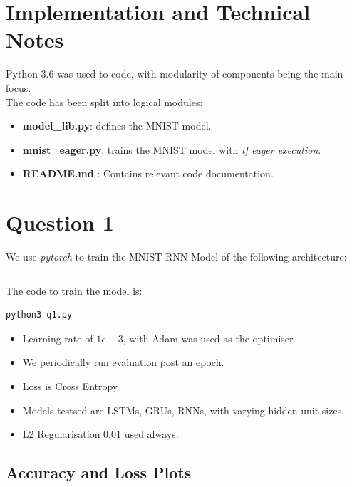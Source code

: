\section {Implementation and Technical Notes}

Python 3.6 was used to code, with modularity of components being the main focus. \\

The code has been split into logical modules: \\
\begin{itemize}
\item \textbf{model\_lib.py}: defines the MNIST model. 
\item \textbf{mnist\_eager.py}: trains the MNIST model with \textit{tf eager execution}. 
\item  \textbf{README.md }: Contains relevant code documentation.
\end{itemize}


\section {Question 1}

We use \textit{pytorch } to train the MNIST RNN Model of the following architecture:

\begin{lstlisting}

\end{lstlisting}

The code to train the model is:

\begin{lstlisting}
python3 q1.py
\end{lstlisting}

\begin{itemize}
\item Learning rate of $1e-3$, with Adam was used as the optimiser.
\item We periodically run evaluation post an epoch. 
\item Loss is Cross Entropy
\item Models testsed are LSTMs, GRUs, RNNs, with varying hidden unit sizes.
\item L2 Regularisation 0.01 used always.
\end{itemize}

\subsection{Accuracy and Loss Plots}

